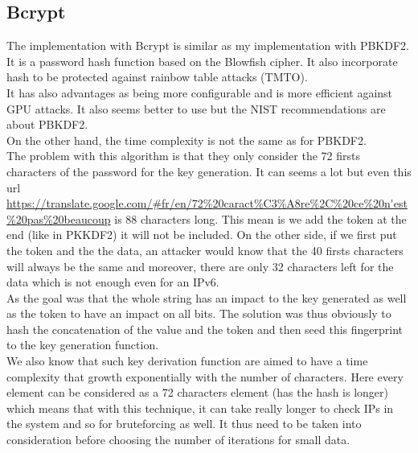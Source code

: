 \documentclass{eplmastersthesis}
\begin{document}
\subsection{Bcrypt}
The implementation with Bcrypt is similar as my implementation with PBKDF2. It is a password hash function based on the Blowfish cipher. It also incorporate hash to be protected against rainbow table attacks (TMTO).\\
It has also advantages as being more configurable and is more efficient against GPU attacks. It also seems better to use but the NIST recommendations are about PBKDF2.\\

On the other hand, the time complexity is not the same as for PBKDF2.\\
The problem with this algorithm is that they only consider the 72 firsts characters of the password for the key generation. It can seems a lot but even this url \url{https://translate.google.com/#fr/en/72\%20caract\%C3\%A8re\%2C\%20ce\%20n'est\%20pas\%20beaucoup} is 88 characters long. This mean is we add the token at the end (like in PKKDF2) it will not be included. On the other side, if we first put the token and the the data, an attacker would know that the 40 firsts characters will always be the same and moreover, there are only 32 characters left for the data which is not enough even for an IPv6.\\
As the goal was that the whole string has an impact to the key generated as well as the token to have an impact on all bits. The solution was thus obviously to hash the concatenation of the value and the token and then seed this fingerprint to the key generation function.\\

We also know that such key derivation function are aimed to have a time complexity that growth exponentially with the number of characters. Here every element can be considered as a 72 characters element (has the hash is longer) which means that with this technique, it can take really longer to check IPs in the system and so for bruteforcing as well. It thus need to be taken into consideration before choosing the number of iterations for small data.
\end{document}
